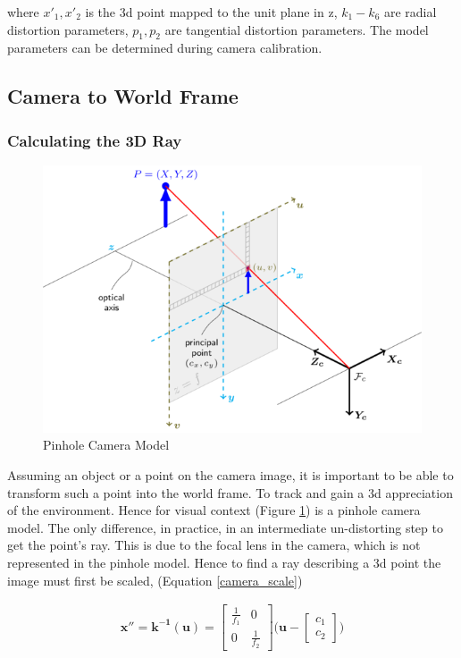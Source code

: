 \documentclass[a4paper,11pt,notitlepage]{article}
\begin{document}
where $x'_{1},x'_{2}$ is the 3d point mapped to the unit plane in z, $k_{1}-k_{6}$ are radial distortion parameters, $p_{1},p_{2}$ are tangential distortion parameters. The model parameters can be determined during camera calibration.


\subsection{Camera to World Frame}

\subsubsection{Calculating the 3D Ray}

\noindent \begin{figure}[h!]
	\includegraphics[width = 1.0\hsize]{figures/pinhole_camera_model.png}
	\caption{Pinhole Camera Model}
	\label{pinhole_model}
\end{figure}

Assuming an object or a point on the camera image, it is important to be able to transform such a point into the world frame. To track and gain a 3d appreciation of the environment. Hence for visual context (Figure \ref{pinhole_model}) is a pinhole camera model. The only difference, in practice, in an intermediate un-distorting step to get the point's ray. This is due to the focal lens in the camera, which is not represented in the pinhole model. Hence to find a ray describing a 3d point the image must first be scaled, (Equation \ref{camera_scale})


\begin{equation}
\begin{aligned}
\mathbf{x''} = \mathbf{k^{-1}(u)} = 
\begin{bmatrix}
\frac{1}{f_{1}} & 0 \\[0.3em]
0 & \frac{1}{f_{2}}
\end{bmatrix}
\bigg (
\mathbf{u} -
\begin{bmatrix}
c_{1} \\[0.3em]
c_{2}
\end{bmatrix}
\bigg )
\end{aligned}
\label{camera_scale}
\end{equation}
\end{document}

